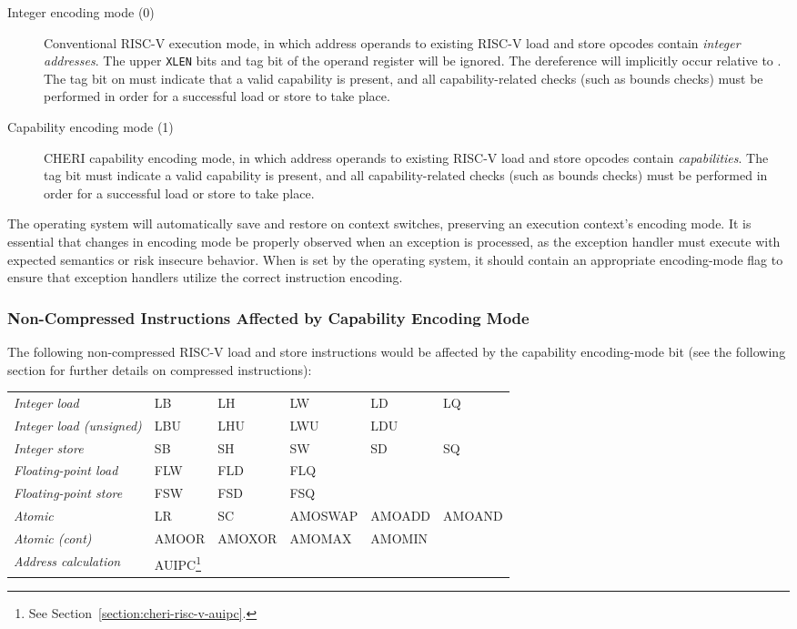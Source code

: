 \begin{description}
\item[Integer encoding mode (0)] Conventional RISC-V execution mode, in which
  address operands to existing RISC-V load and store opcodes contain
  \textit{integer addresses}.
  The upper \texttt{XLEN} bits and tag bit of
  the operand register will be ignored.
  The dereference will implicitly occur relative to \DDC{}.
  The tag bit on \DDC{} must indicate that a valid capability is present, and
  all capability-related checks (such as bounds checks) must be performed in
  order for a successful load or store to take place.

\item[Capability encoding mode (1)] CHERI capability encoding mode, in which address operands to
  existing RISC-V load and store opcodes contain \textit{capabilities}.
  The tag bit must indicate a valid capability is present, and all
  capability-related checks (such as bounds checks) must be performed in order
  for a successful load or store to take place.
\end{description}

The operating system will automatically save and restore \PCC{} on context
switches, preserving an execution context's encoding mode.
It is essential that changes in encoding mode be properly observed when an
exception is processed, as the exception handler must execute with expected
semantics or risk insecure behavior.
When \xTCC{} is set by the operating system, it should contain an appropriate
encoding-mode flag to ensure that exception handlers utilize the correct
instruction encoding.

\subsubsection{Non-Compressed Instructions Affected by Capability Encoding
  Mode}

The following non-compressed RISC-V load and store instructions would be
affected by the capability encoding-mode bit (see the following section for
further details on compressed instructions):

\medskip

\begin{savenotes}
\begin{tabular}{llllll}
\textit{Integer load} & LB & LH & LW & LD & LQ \\
\textit{Integer load (unsigned)} & LBU & LHU & LWU & LDU & \\
\textit{Integer store} & SB & SH & SW & SD & SQ \\
\textit{Floating-point load} & FLW & FLD & FLQ & & \\
\textit{Floating-point store} & FSW & FSD & FSQ & & \\
\textit{Atomic} & LR & SC & AMOSWAP & AMOADD & AMOAND \\
\textit{Atomic (cont)} & AMOOR & AMOXOR & AMOMAX & AMOMIN & \\
\textit{Address calculation} & AUIPC\footnote{See Section~\ref{section:cheri-risc-v-auipc}.} & & & & \\
\end{tabular}
\end{savenotes}

